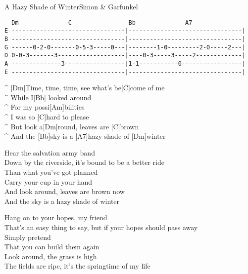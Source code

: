 \begin{song}{A Hazy Shade of Winter}{Simon \& Garfunkel}

{\scriptsize
\begin{verbatim}
  Dm              C                Bb              A7
E --------------------------------|--------------------------------|
B --------------------------------|--------------------------------|
G ------0-2-0-------0-5-3-----0---|--------1-0---------2-0-----2---|
D 0-0-3-------3-------------------|----0-3-----3-----2-------------|
A --------------3-----------------|1-1-----------0-----------------|
E --------------------------------|--------------------------------|
\end{verbatim}
}

\begin{guitar}
^ [Dm]Time, time, time, see what's be[C]come of me\\
^ While I[Bb] looked around\\
^ For my possi[Am]bilities\\
^ I was so [C]hard to please\\
^ But look a[Dm]round, leaves are [C]brown\\
^ And the [Bb]sky is a [A7]hazy shade of [Dm]winter\\
\end{guitar}

\begin{guitar}
Hear the salvation army band\\
Down by the riverside, it's bound to be a better ride\\
Than what you've got planned\\
Carry your cup in your hand\\
And look around, leaves are brown now\\
And the sky is a hazy shade of winter\\
\end{guitar}

\begin{guitar}
Hang on to your hopes, my friend\\
That's an easy thing to say, but if your hopes should pass away\\
Simply pretend\\
That you can build them again\\
Look around, the grass is high\\
The fields are ripe, it's the springtime of my life\\
\end{guitar}


\end{song}
